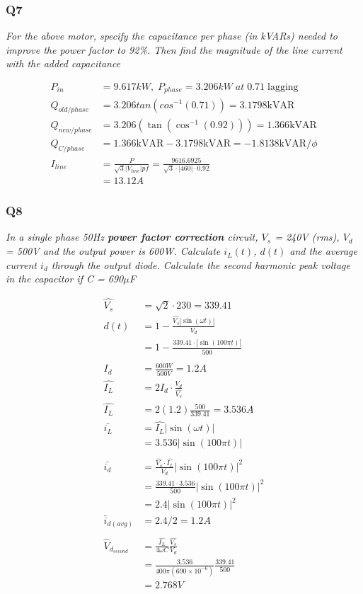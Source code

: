 \documentclass[a4paper,11pt]{article}
\begin{document}
\subsubsection*{Q7}
\textit{For the above motor, specify the capacitance per phase (in kVARs) needed to improve the power factor to 92\%. Then find the magnitude of the line current with the added capacitance}

\begin{align*}
    P_{in} &= 9.617kW,\; P_{phase}=3.206kW\;at\;0.71\;\mathrm{lagging}\\
    Q_{old/phase} &= 3.206tan(cos^{-1}(0.71)) = 3.1798 \mathrm{kVAR} \\
    Q_{new/phase} &= 3.206\left(\tan\left(\cos^{-1}\left(0.92\right)\right)\right) = 1.366 \mathrm{kVAR} \\
    Q_{C/phase} &= 1.366\mathrm{kVAR} - 3.1798\mathrm{kVAR}=-1.8138 \mathrm{kVAR}/\phi\\
    I_{line} &= \frac{P}{\sqrt{3}|V_{line}|pf} = \frac{9616.6925}{\sqrt{3}\cdot\left|460\right|\cdot0.92}\\
    &= 13.12 A
\end{align*}


\subsubsection*{Q8}
\textit{In a single phase 50Hz \textbf{power factor correction} circuit, $V_s$ = 240V (rms), $V_d$ = 500V and the output power is 600W. Calculate $i_L(t)$, $d(t)$ and the average current $i_d$ through the output diode. Calculate the second harmonic peak voltage in the capacitor if C = 690$\mu$F}

\begin{align*}
    \hat{V_s} &= \sqrt{2} \cdot 230 = 339.41\\
    d(t) &= 1-\frac{\hat{V_s} | \sin(\omega t)|}{V_d}\\
    &= 1-\frac{339.41 \cdot | \sin(100\pi t)|}{500}\\\\
    I_d &= \frac{600W}{500V} = 1.2A\\
    \hat{I_L} &= 2I_d \cdot \frac{V_d}{\hat{V_s}}\\
    \hat{I_L} &= 2(1.2)\frac{500}{339.41} = 3.536A\\
    \bar{i_L} &= \hat{I_L}|\sin(\omega t)|\\
    &= 3.536|\sin(100\pi t)|\\\\
    \bar{i_d} &= \frac{\hat{V_s} \cdot \hat{I_L}}{V_d}|\sin(100\pi t)|^2 \\
              &= \frac{339.41 \cdot 3.536}{500}|\sin(100\pi t)|^2\\
              &= 2.4|\sin(100\pi t)|^2 \\
    \bar{i}_{d(avg)} &= 2.4/2 = 1.2A\\\\
    \hat{V}_{d_{second}} &= \frac{\hat{I_L}}{4\omega C}\frac{\hat{V_s}}{V_d} \\
     &= \frac{3.536}{400\pi(690\times10^{-6})}\frac{339.41}{500} \\
    &= 2.768V
\end{align*}
\end{document}
